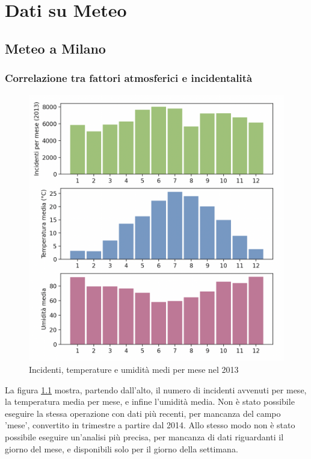 \documentclass[a4paper]{report}
\begin{document}
{}
\chapter{Dati su Meteo}

\section{Meteo a Milano}

\subsection{Correlazione tra fattori atmosferici e incidentalità}

\begin{figure}
    \includegraphics[width=\linewidth]{../src/meteo/milano/temp_incidenti.png}
    \caption{Incidenti, temperature e umidità medi per mese nel 2013}
    \label{fig:incidenti-temp}
\end{figure}

La figura \ref{fig:incidenti-temp} mostra, partendo dall'alto, il numero di incidenti 
avvenuti per mese, la temperatura media per mese, e infine l'umidità media.
Non è stato possibile eseguire la stessa operazione con dati più recenti, per mancanza del 
campo 'mese', convertito in trimestre a partire dal 2014.
Allo stesso modo non è stato possibile eseguire un'analisi più precisa, per mancanza di dati 
riguardanti il giorno del mese, e disponibili solo per il giorno della settimana.
\end{document}
